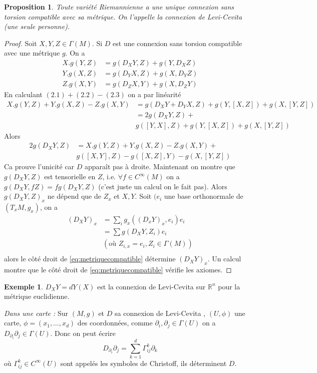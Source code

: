 \documentclass[a4paper,12pt]{book}
\newcommand{\R}{\mathbb{R}}
\theoremstyle{plain}
\newtheorem{prop}[subsection]{Proposition}
\theoremstyle{definition}
\newtheorem{ex}[subsection]{Exemple}
\theoremstyle{remark}
\begin{document}
\begin{prop}
    Toute variété Riemannienne a une unique connexion sans torsion 
    compatible avec sa métrique. On l'appelle la connexion de 
    Levi-Cevita (une seule personne).
\end{prop}
\begin{proof}
    Soit $X,Y,Z\in \Gamma(M)$. Si $D$ est une connexion sans torsion
    compatible avec une métrique $g$. On a 
    \begin{align}
        X.g(Y,Z)&=g(D_XY,Z)+g(Y,D_XZ)\\
        Y.g(X,Z)&=g(D_YX,Z)+g(X,D_YZ)\\
        Z.g(X,Y)&=g(D_ZX,Y)+g(X,D_ZY)
    \end{align}
    En calculant $(2.1)+(2.2)-(2.3)$ on a par linéarité
    \begin{align*}
    X.g(Y,Z)+Y.g(X,Z)-Z.g(X,Y)&=g(D_XY+D_YX,Z)+g(Y,[X,Z])+g(X,[Y,Z])\\
                              &=2g(D_XY,Z)+\\
                              &g([Y,X],Z)+g(Y,[X,Z])+g(X,[Y,Z])
    \end{align*}
    Alors 
    \begin{align*}\label{eq:metriquecompatible}
        2g(D_XY,Z)&=X.g(Y,Z)+Y.g(X,Z)-Z.g(X,Y)+\\
                  &g([X,Y],Z)-g([X,Z],Y)-g(X,[Y,Z])
    \end{align*}
    Ca prouve l'unicité car $D$ apparaît pas à droite.
    Maintenant on montre que $g(D_XY, Z)$ est tensorielle en $Z$, i.e.
    $\forall f\in C^{\infty}(M)$ on a $g(D_XY,fZ)=fg(D_XY,Z)$ (c'est
    juste un calcul on le fait pas). Alors $g(D_XY,Z)_x$ ne dépend que de
    $Z_x$ et $X,Y$. Soit $(e_i$ une base orthonormale de $(T_xM, g_x)$,
    on a
    \begin{align*}
        (D_XY)_x&=\sum_ig_x((D_xY)_x,e_i)e_i\\
                &=\sum g(D_XY, Z_i)e_i\\
                &(\textrm{où }Z_{i,x}=e_i, Z_i\in \Gamma(M))\\
    \end{align*}
    alors le côté droit de \ref{eq:metriquecompatible} détermine
    $(D_XY)_x$. Un calcul montre que le côté droit de 
    \ref{eq:metriquecompatible} vérifie les axiomes.
\end{proof}
\begin{ex}
    $D_XY=dY(X)$ est la connexion de Levi-Cevita sur $\R^n$ pour la 
    métrique euclidienne.
\end{ex}
\textit{Dans une carte :} Sur $(M,g)$  et $D$ sa connexion de Levi-Cevita
, $(U,\phi)$ une carte, $\phi=(x_1,\ldots,x_d)$ des coordonnées, comme
$\partial_i,\partial_j\in \Gamma(U)$ on a $D_{\partial_i}\partial_j\in
\Gamma(U)$. Donc on peut écrire 
\[D_{\partial_i}\partial_j=\sum_{k=1}^d \Gamma_{ij}^k\partial_k\]
où $\Gamma_{ij}^k\in C^{\infty}(U)$ sont appelés les symboles de 
Christoff, ils déterminent $D$. 
\end{document}
